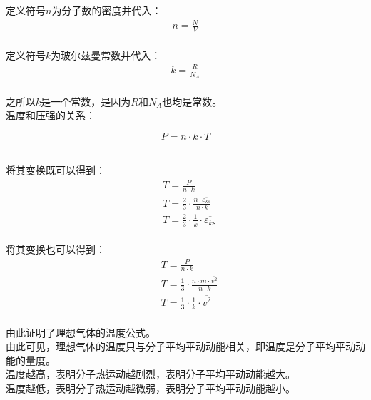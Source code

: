 \documentclass[UTF8]{ctexart}
\begin{document}
\newpage

    定义符号$n$为分子数的密度并代入：
    \begin{align}
        n=\frac{N}{V}
    \end{align}\\
    定义符号$k$为玻尔兹曼常数并代入：
    \begin{align}
        k=\frac{R}{N_A}
    \end{align}\\
    之所以$k$是一个常数，是因为$R$和$N_A$也均是常数。\\[6mm]
    温度和压强的关系：
    \begin{large}
        \begin{equation*}
            P=n\cdot k\cdot T    
        \end{equation*}
    \end{large}\\
    将其变换既可以得到：
    \begin{align}
        &T=\frac{P}{n\cdot k}\\[3mm]
        &T=\frac{2}{3}\cdot\frac{n\cdot\overline{\varepsilon_{ks}}}{n\cdot k}\\[3mm]
        &T=\frac{2}{3}\cdot\frac{1}{k}\cdot\overline{\varepsilon_{ks}}
    \end{align}\\
    将其变换也可以得到：
    \begin{align}
        &T=\frac{P}{n\cdot k}\\[3mm]
        &T=\frac{1}{3}\cdot\frac{n\cdot m\cdot\overline{v^2}}{n\cdot k}\\[3mm]
        &T=\frac{1}{3}\cdot\frac{1}{k}\cdot\overline{v^2}
    \end{align}\\
    由此证明了理想气体的温度公式。\\[3mm]
    由此可见，理想气体的温度只与分子平均平动动能相关，即温度是分子平均平动动能的量度。\\[3mm]
    温度越高，表明分子热运动越剧烈，表明分子平均平动动能越大。\\[3mm]
    温度越低，表明分子热运动越微弱，表明分子平均平动动能越小。

\newpage
\end{document}
